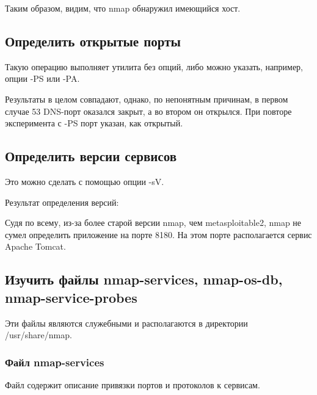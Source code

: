 \documentclass[a4paper]{article}
\begin{document}


Таким образом, видим, что nmap обнаружил имеющийся хост.

\subsection{Определить открытые порты}

Такую операцию выполняет утилита без опций, либо можно указать, например, опции -PS или -PA.





Результаты в целом совпадают, однако, по непонятным причинам, в первом случае 53 DNS-порт оказался закрыт, а во втором он открылся. При повторе эксперимента с -PS порт указан, как открытый.

\subsection{Определить версии сервисов}

Это можно сделать с помощью опции -sV.

Результат определения версий:



Судя по всему, из-за более старой версии nmap, чем metasploitable2, nmap не сумел определить приложение на порте 8180. На этом порте располагается сервис Apache Tomcat.

\subsection{Изучить файлы nmap-services, nmap-os-db, nmap-service-probes}

Эти файлы являются служебными и располагаются в директории /usr/share/nmap.



\subsubsection{Файл nmap-services}

Файл содержит описание привязки портов и протоколов к сервисам.
\end{document}
